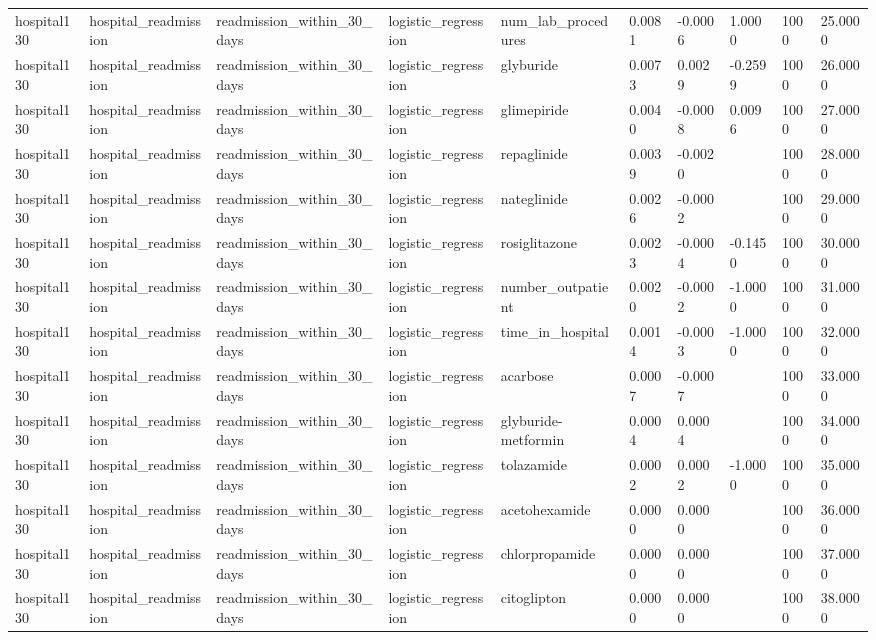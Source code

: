 \begin{tabular}{llllllllll}
hospital130 & hospital\_readmission & readmission\_within\_30\_days & logistic\_regression & num\_lab\_procedures & 0.0081 & -0.0006 & 1.0000 & 1000 & 25.0000 \\
hospital130 & hospital\_readmission & readmission\_within\_30\_days & logistic\_regression & glyburide & 0.0073 & 0.0029 & -0.2599 & 1000 & 26.0000 \\
hospital130 & hospital\_readmission & readmission\_within\_30\_days & logistic\_regression & glimepiride & 0.0040 & -0.0008 & 0.0096 & 1000 & 27.0000 \\
hospital130 & hospital\_readmission & readmission\_within\_30\_days & logistic\_regression & repaglinide & 0.0039 & -0.0020 &  & 1000 & 28.0000 \\
hospital130 & hospital\_readmission & readmission\_within\_30\_days & logistic\_regression & nateglinide & 0.0026 & -0.0002 &  & 1000 & 29.0000 \\
hospital130 & hospital\_readmission & readmission\_within\_30\_days & logistic\_regression & rosiglitazone & 0.0023 & -0.0004 & -0.1450 & 1000 & 30.0000 \\
hospital130 & hospital\_readmission & readmission\_within\_30\_days & logistic\_regression & number\_outpatient & 0.0020 & -0.0002 & -1.0000 & 1000 & 31.0000 \\
hospital130 & hospital\_readmission & readmission\_within\_30\_days & logistic\_regression & time\_in\_hospital & 0.0014 & -0.0003 & -1.0000 & 1000 & 32.0000 \\
hospital130 & hospital\_readmission & readmission\_within\_30\_days & logistic\_regression & acarbose & 0.0007 & -0.0007 &  & 1000 & 33.0000 \\
hospital130 & hospital\_readmission & readmission\_within\_30\_days & logistic\_regression & glyburide-metformin & 0.0004 & 0.0004 &  & 1000 & 34.0000 \\
hospital130 & hospital\_readmission & readmission\_within\_30\_days & logistic\_regression & tolazamide & 0.0002 & 0.0002 & -1.0000 & 1000 & 35.0000 \\
hospital130 & hospital\_readmission & readmission\_within\_30\_days & logistic\_regression & acetohexamide & 0.0000 & 0.0000 &  & 1000 & 36.0000 \\
hospital130 & hospital\_readmission & readmission\_within\_30\_days & logistic\_regression & chlorpropamide & 0.0000 & 0.0000 &  & 1000 & 37.0000 \\
hospital130 & hospital\_readmission & readmission\_within\_30\_days & logistic\_regression & citoglipton & 0.0000 & 0.0000 &  & 1000 & 38.0000 \\

\end{tabular}
